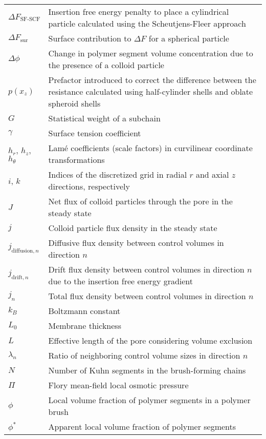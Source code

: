 \documentclass[10pt, a4paper]{article}
\begin{document}
\begin{tabularx}{\linewidth}{l X}
    $\Delta F_{\text{SF-SCF}}$ & Insertion free energy penalty to place a cylindrical particle calculated using the Scheutjens-Fleer approach \\
    $\Delta F_{\text{sur}}$ & Surface contribution to $\Delta F$ for a spherical particle\\
    $\Delta \phi$ & Change in polymer segment volume concentration due to the presence of a colloid particle \\
    $p(x_z)$ & Prefactor introduced to correct the difference between the resistance calculated using half-cylinder shells and oblate spheroid shells \\
    $G$ & Statistical weight of a subchain \\
    $\gamma$ & Surface tension coefficient \\
    $h_{r}$, $h_{z}$, $h_{\theta}$ & Lam\'e coefficients (scale factors) in curvilinear coordinate transformations \\
    $i$, $k$ & Indices of the discretized grid in radial $r$ and axial $z$ directions, respectively \\
    $J$ & Net flux of colloid particles through the pore in the steady state \\
    $j$ & Colloid particle flux density in the steady state \\
    $j_{\text{diffusion}, n}$ & Diffusive flux density between control volumes in direction $n$ \\
    $j_{\text{drift}, n}$ & Drift flux density between control volumes in direction $n$ due to the insertion free energy gradient \\
    $j_{n}$ & Total flux density between control volumes in direction $n$ \\
    $k_B$ & Boltzmann constant \\
    $L_{0}$ & Membrane thickness \\
    $L$ & Effective length of the pore considering volume exclusion \\
    $\lambda_{n}$ & Ratio of neighboring control volume sizes in direction $n$ \\
    $N$ & Number of Kuhn segments in the brush-forming chains \\
    $\Pi$ & Flory mean-field local osmotic pressure \\
    $\phi$ & Local volume fraction of polymer segments in a polymer brush \\
    $\phi^{\ast}$ & Apparent local volume fraction of polymer segments \\

\end{tabularx}
\end{document}
